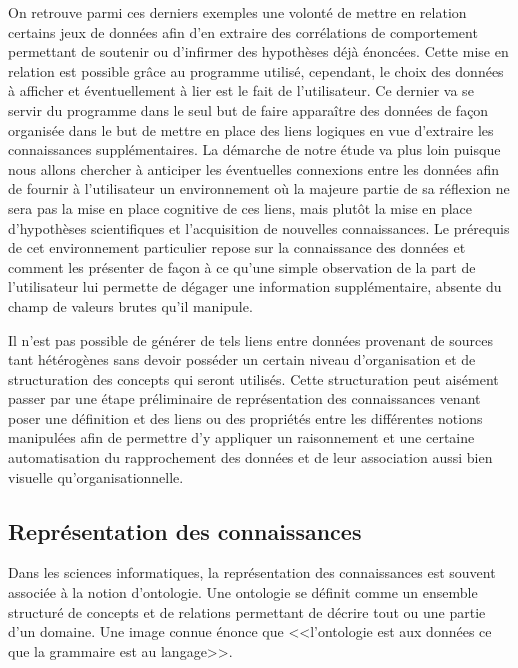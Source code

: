 On retrouve parmi ces derniers exemples une volonté de mettre en relation certains jeux de données afin d'en extraire des corrélations de comportement permettant de soutenir ou d'infirmer des hypothèses déjà énoncées. Cette mise en relation est possible grâce au programme utilisé, cependant, le choix des données à afficher et éventuellement à lier est le fait de l'utilisateur. Ce dernier va se servir du programme dans le seul but de faire apparaître des données de façon organisée dans le but de mettre en place des liens logiques en vue d'extraire les connaissances supplémentaires. La démarche de notre étude va plus loin puisque nous allons chercher à anticiper les éventuelles connexions entre les données afin de fournir à l'utilisateur un environnement où la majeure partie de sa réflexion ne sera pas la mise en place cognitive de ces liens, mais plutôt la mise en place d'hypothèses scientifiques et l'acquisition de nouvelles connaissances. Le prérequis de cet environnement particulier repose sur la connaissance des données et comment les présenter de façon à ce qu'une simple observation de la part de l'utilisateur lui permette de dégager une information supplémentaire, absente du champ de valeurs brutes qu'il manipule.

Il n'est pas possible de générer de tels liens entre données provenant de sources tant hétérogènes sans devoir posséder un certain niveau d'organisation et de structuration des concepts qui seront utilisés. Cette structuration peut aisément passer par une étape préliminaire de représentation des connaissances venant poser une définition et des liens ou des propriétés entre les différentes notions manipulées afin de permettre d'y appliquer un raisonnement et une certaine automatisation du rapprochement des données et de leur association aussi bien visuelle qu'organisationnelle.


\subsection{Représentation des connaissances}

Dans les sciences informatiques, la représentation des connaissances est souvent associée à la notion d'ontologie. Une ontologie se définit comme un ensemble structuré de concepts et de relations permettant de décrire tout ou une partie d'un domaine. Une image connue énonce que <<l'ontologie est aux données ce que la grammaire est au langage>>.

